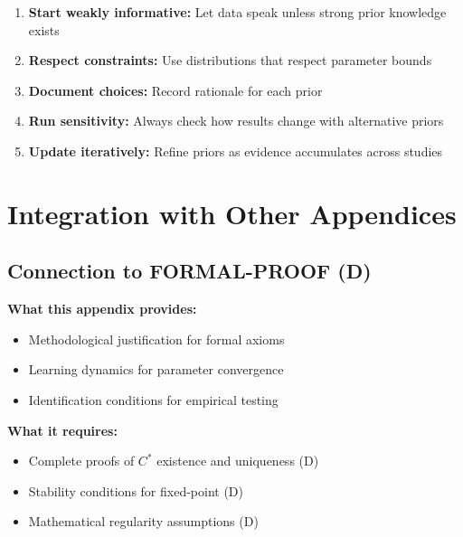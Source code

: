 \begin{tcolorbox}[colback=green!5!white, colframe=green!75!black,
    title=Best Practices for Prior Specification]
\begin{enumerate}
\item \textbf{Start weakly informative:} Let data speak unless strong prior knowledge exists
\item \textbf{Respect constraints:} Use distributions that respect parameter bounds
\item \textbf{Document choices:} Record rationale for each prior
\item \textbf{Run sensitivity:} Always check how results change with alternative priors
\item \textbf{Update iteratively:} Refine priors as evidence accumulates across studies
\end{enumerate}
\end{tcolorbox}


\section{Integration with Other Appendices}
\label{sec:az-integration}

\subsection{Connection to FORMAL-PROOF (D)}

\begin{tcolorbox}[colback=yellow!5!white, colframe=yellow!75!black,
    title=Integration: METHOD-CONSTRUCT $\leftrightarrow$ FORMAL-PROOF (D)]
\textbf{What this appendix provides:}
\begin{itemize}[nosep]
\item Methodological justification for formal axioms
\item Learning dynamics for parameter convergence
\item Identification conditions for empirical testing
\end{itemize}

\textbf{What it requires:}
\begin{itemize}[nosep]
\item Complete proofs of $C^*$ existence and uniqueness (D)
\item Stability conditions for fixed-point (D)
\item Mathematical regularity assumptions (D)
\end{itemize}
\end{tcolorbox}

